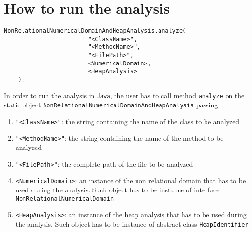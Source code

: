 \documentclass[11pt]{article}
\newcommand{\statement}[1]{\lstinline{#1}}
\newcommand{\Java}{\ensuremath{\mathsf{Java}}}
\begin{document}
\section{How to run the analysis}
\begin{lstlisting}
NonRelationalNumericalDomainAndHeapAnalysis.analyze(
						"<ClassName>",
						"<MethodName>",
						"<FilePath>",
						<NumericalDomain>,
						<HeapAnalysis>
	);
\end{lstlisting}
In order to run the analysis in \Java, the user has to call method \statement{analyze} on the static object \statement{NonRelationalNumericalDomainAndHeapAnalysis} passing
\begin{enumerate}
\item \statement{"<ClassName>"}: the string containing the name of the class to be analyzed
\item \statement{"<MethodName>"}: the string containing the name of the method to be analyzed
\item \statement{"<FilePath>"}: the complete path of the file to be analyzed
\item \statement{<NumericalDomain>}: an instance of the non relational domain that has to be used during the analysis. Such object has to be instance of interface \statement{NonRelationalNumericalDomain}
\item \statement{<HeapAnalysis>}: an instance of the heap analysis that has to be used during the analysis. Such object has to be instance of abstract class \statement{HeapIdentifier}
\end{enumerate}
\end{document}
